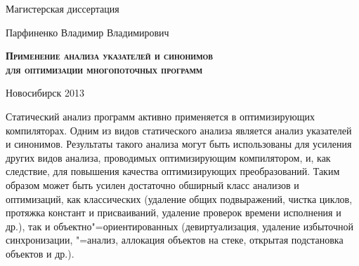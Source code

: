 \documentclass[14pt,titlepage,draft]{extarticle}
\begin{document}
\begin{center}
{      \vspace{1.2cm}

      Магистерская диссертация

      \vspace{0.5cm}

      {\large Парфиненко Владимир Владимирович \par}

      \vspace{1.1cm}

      {\large \scshape \bfseries
        Применение анализа указателей и синонимов\\
        для оптимизации многопоточных программ \par
      }

      \vspace{2.5cm}


      \hfill{}

      \vfill

      Новосибирск 2013
    }
  \end{center}

    \clearpage
    \listoftodos

    \tableofcontents


    Статический анализ программ активно применяется в оптимизирующих
    компиляторах. Одним из видов статического анализа является анализ
    указателей и синонимов. Результаты такого анализа могут быть использованы
    для усиления других видов анализа, проводимых оптимизирующим компилятором,
    и, как следствие, для повышения качества оптимизирующих преобразований.
    Таким образом может быть усилен достаточно обширный класс анализов и
    оптимизаций, как классических (удаление общих
    подвыражений, чистка циклов, протяжка констант и присваиваний, удаление
    проверок времени исполнения и др.), так и объектно"=ориентированных
    (девиртуализация, удаление избыточной синхронизации, "=анализ,
    аллокация объектов на стеке, открытая подстановка объектов и др.).
\end{document}
